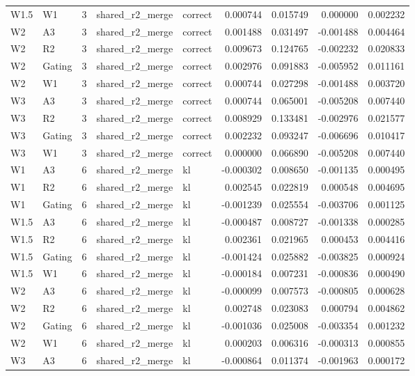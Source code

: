 \begin{tabular}{llrllrrrr}
W1.5 & W1 & 3 & shared_r2_merge & correct & 0.000744 & 0.015749 & 0.000000 & 0.002232 \\
W2 & A3 & 3 & shared_r2_merge & correct & 0.001488 & 0.031497 & -0.001488 & 0.004464 \\
W2 & R2 & 3 & shared_r2_merge & correct & 0.009673 & 0.124765 & -0.002232 & 0.020833 \\
W2 & Gating & 3 & shared_r2_merge & correct & 0.002976 & 0.091883 & -0.005952 & 0.011161 \\
W2 & W1 & 3 & shared_r2_merge & correct & 0.000744 & 0.027298 & -0.001488 & 0.003720 \\
W3 & A3 & 3 & shared_r2_merge & correct & 0.000744 & 0.065001 & -0.005208 & 0.007440 \\
W3 & R2 & 3 & shared_r2_merge & correct & 0.008929 & 0.133481 & -0.002976 & 0.021577 \\
W3 & Gating & 3 & shared_r2_merge & correct & 0.002232 & 0.093247 & -0.006696 & 0.010417 \\
W3 & W1 & 3 & shared_r2_merge & correct & 0.000000 & 0.066890 & -0.005208 & 0.007440 \\
W1 & A3 & 6 & shared_r2_merge & kl & -0.000302 & 0.008650 & -0.001135 & 0.000495 \\
W1 & R2 & 6 & shared_r2_merge & kl & 0.002545 & 0.022819 & 0.000548 & 0.004695 \\
W1 & Gating & 6 & shared_r2_merge & kl & -0.001239 & 0.025554 & -0.003706 & 0.001125 \\
W1.5 & A3 & 6 & shared_r2_merge & kl & -0.000487 & 0.008727 & -0.001338 & 0.000285 \\
W1.5 & R2 & 6 & shared_r2_merge & kl & 0.002361 & 0.021965 & 0.000453 & 0.004416 \\
W1.5 & Gating & 6 & shared_r2_merge & kl & -0.001424 & 0.025882 & -0.003825 & 0.000924 \\
W1.5 & W1 & 6 & shared_r2_merge & kl & -0.000184 & 0.007231 & -0.000836 & 0.000490 \\
W2 & A3 & 6 & shared_r2_merge & kl & -0.000099 & 0.007573 & -0.000805 & 0.000628 \\
W2 & R2 & 6 & shared_r2_merge & kl & 0.002748 & 0.023083 & 0.000794 & 0.004862 \\
W2 & Gating & 6 & shared_r2_merge & kl & -0.001036 & 0.025008 & -0.003354 & 0.001232 \\
W2 & W1 & 6 & shared_r2_merge & kl & 0.000203 & 0.006316 & -0.000313 & 0.000855 \\
W3 & A3 & 6 & shared_r2_merge & kl & -0.000864 & 0.011374 & -0.001963 & 0.000172 \\

\end{tabular}
